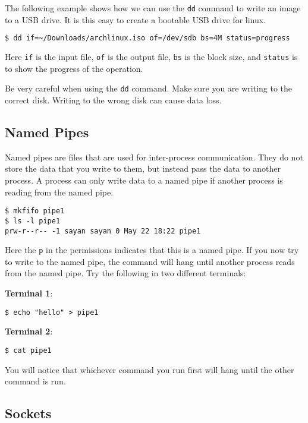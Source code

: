 The following example shows how we can use the \texttt{dd} command to write an image
to a USB drive.
It is this easy to create a bootable USB drive for linux.

\begin{lstlisting}[language=bash]
  $ dd if=~/Downloads/archlinux.iso of=/dev/sdb bs=4M status=progress
\end{lstlisting}

Here \texttt{if} is the input file, \texttt{of} is the output file, \texttt{bs} is the block size, and \texttt{status} is to show the progress of the operation.

\begin{warn}
  Be very careful when using the \texttt{dd} command.
  Make sure you are writing to the correct disk.
  Writing to the wrong disk can cause data loss.
\end{warn}


\subsection{Named Pipes}

Named pipes
are files that are used for inter-process communication.
They do not store the data that you write to them, but instead pass the data to another process.
A process can only write data to a named pipe if another process is reading from the named pipe.

\begin{lstlisting}
$ mkfifo pipe1
$ ls -l pipe1
prw-r--r-- -1 sayan sayan 0 May 22 18:22 pipe1
\end{lstlisting}

Here the \texttt{p} in the permissions indicates that this is a named pipe.
If you now try to write to the named pipe, the command will hang until another process reads from the named pipe.
Try the following in two different terminals:

\textbf{Terminal 1}:
\begin{lstlisting}
$ echo "hello" > pipe1
\end{lstlisting}

\textbf{Terminal 2}:
\begin{lstlisting}
$ cat pipe1
\end{lstlisting}

You will notice that whichever command you run first will hang until the other command is run.

\subsection{Sockets}

